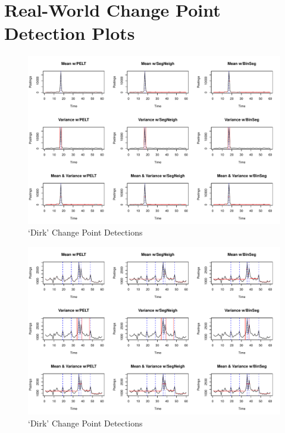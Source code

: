 \documentclass{uvamscse}	%
\begin{document}
\chapter{Real-World Change Point Detection Plots}
\label{changeplots}

\begin{figure}[h]
    \includegraphics[width=\textwidth]{figures/dirkresults}
    \caption{`Dirk' Change Point Detections}
    \label{fig:dirk}
\end{figure}

\begin{figure}[h]
    \includegraphics[width=\textwidth]{figures/ziggoresults}
    \caption{`Dirk' Change Point Detections}
    \label{fig:ziggo}
\end{figure}
\end{document}
